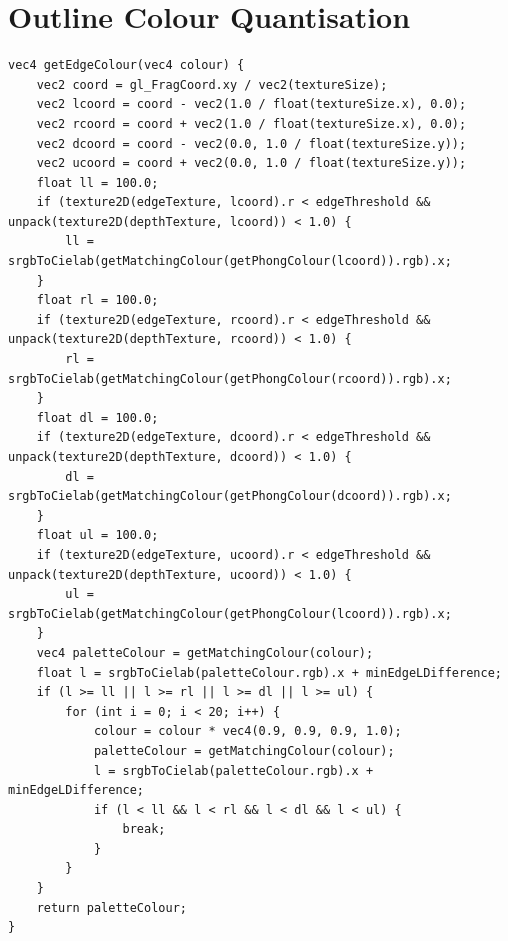 \documentclass[12pt,twoside,notitlepage]{report}
\begin{document}
\chapter{Outline Colour Quantisation}
\label{app:outlines}
\begin{lstlisting}
vec4 getEdgeColour(vec4 colour) {
	vec2 coord = gl_FragCoord.xy / vec2(textureSize);
	vec2 lcoord = coord - vec2(1.0 / float(textureSize.x), 0.0);
	vec2 rcoord = coord + vec2(1.0 / float(textureSize.x), 0.0);
	vec2 dcoord = coord - vec2(0.0, 1.0 / float(textureSize.y));
	vec2 ucoord = coord + vec2(0.0, 1.0 / float(textureSize.y));
	float ll = 100.0;
	if (texture2D(edgeTexture, lcoord).r < edgeThreshold && unpack(texture2D(depthTexture, lcoord)) < 1.0) {
		ll = srgbToCielab(getMatchingColour(getPhongColour(lcoord)).rgb).x;
	}
	float rl = 100.0;
	if (texture2D(edgeTexture, rcoord).r < edgeThreshold && unpack(texture2D(depthTexture, rcoord)) < 1.0) {
		rl = srgbToCielab(getMatchingColour(getPhongColour(rcoord)).rgb).x;
	}
	float dl = 100.0;
	if (texture2D(edgeTexture, dcoord).r < edgeThreshold && unpack(texture2D(depthTexture, dcoord)) < 1.0) {
		dl = srgbToCielab(getMatchingColour(getPhongColour(dcoord)).rgb).x;
	}
	float ul = 100.0;
	if (texture2D(edgeTexture, ucoord).r < edgeThreshold && unpack(texture2D(depthTexture, ucoord)) < 1.0) {
		ul = srgbToCielab(getMatchingColour(getPhongColour(lcoord)).rgb).x;
	}
	vec4 paletteColour = getMatchingColour(colour);
	float l = srgbToCielab(paletteColour.rgb).x + minEdgeLDifference;
	if (l >= ll || l >= rl || l >= dl || l >= ul) {
		for (int i = 0; i < 20; i++) {
			colour = colour * vec4(0.9, 0.9, 0.9, 1.0);
			paletteColour = getMatchingColour(colour);
			l = srgbToCielab(paletteColour.rgb).x + minEdgeLDifference;
			if (l < ll && l < rl && l < dl && l < ul) {
				break;
			}
		}
	}
	return paletteColour;
}
\end{lstlisting}
\end{document}

